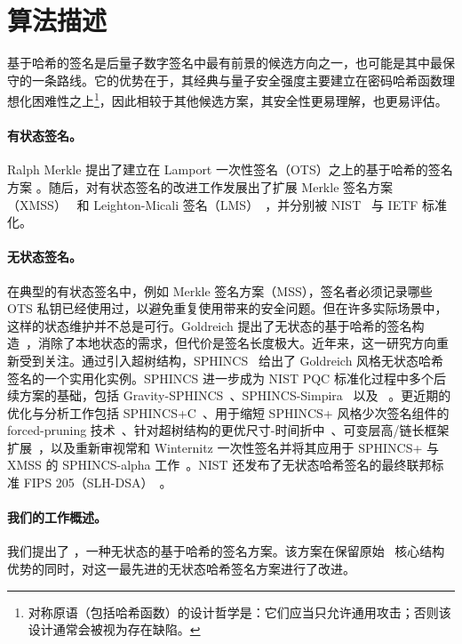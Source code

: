 \section{算法描述} \label{sec:intro}

基于哈希的签名是后量子数字签名中最有前景的候选方向之一，也可能是其中最保守的一条路线。它的优势在于，其经典与量子安全强度主要建立在密码哈希函数理想化困难性之上\footnote{对称原语（包括哈希函数）的设计哲学是：它们应当只允许通用攻击；否则该设计通常会被视为存在缺陷。}，因此相较于其他候选方案，其安全性更易理解，也更易评估。

\paragraph{有状态签名。} Ralph Merkle 提出了建立在 Lamport 一次性签名（OTS）之上的基于哈希的签名方案 \cite{C:Merkle89a,Lamport79}。随后，对有状态签名的改进工作发展出了扩展 Merkle 签名方案（XMSS）~\cite{hulsing2018xmss} 和 Leighton-Micali 签名（LMS）~\cite{mcgrew2019leighton}，并分别被 NIST~\cite{cooper2020recommendation} 与 IETF 标准化。

\paragraph{无状态签名。} 在典型的有状态签名中，例如 Merkle 签名方案（MSS），签名者必须记录哪些 OTS 私钥已经使用过，以避免重复使用带来的安全问题。但在许多实际场景中，这样的状态维护并不总是可行。Goldreich 提出了无状态的基于哈希的签名构造~\cite{C:Goldreich86a,Goldreich04}，消除了本地状态的需求，但代价是签名长度极大。近年来，这一研究方向重新受到关注。通过引入超树结构，SPHINCS~\cite{EC:BHHLNP15} 给出了 Goldreich 风格无状态哈希签名的一个实用化实例。SPHINCS 进一步成为 NIST PQC 标准化过程中多个后续方案的基础，包括 Gravity-SPHINCS~\cite{RSA:AumEnd18}、SPHINCS-Simpira~\cite{EPRINT:GueMou17} 以及 \SPHINCSP\ \cite{CCS:BHKNRS19}。更近期的优化与分析工作包括 SPHINCS+C~\cite{SP:HKRY23}、用于缩短 SPHINCS+ 风格少次签名组件的 forced-pruning 技术~\cite{EPRINT:AbrKat25}、针对超树结构的更优尺寸-时间折中~\cite{C:KhoKudWag25}、可变层高/链长框架扩展~\cite{EPRINT:QinSun25}，以及重新审视常和 Winternitz 一次性签名并将其应用于 SPHINCS+ 与 XMSS 的 SPHINCS-alpha 工作~\cite{optimalwots}。NIST 还发布了无状态哈希签名的最终联邦标准 FIPS 205（SLH-DSA）~\cite{NIST:FIPS205}。



\paragraph{我们的工作概述。}
我们提出了 \SPHINCSA，一种无状态的基于哈希的签名方案。该方案在保留原始 \SPHINCSP\ 核心结构优势的同时，对这一最先进的无状态哈希签名方案进行了改进。

